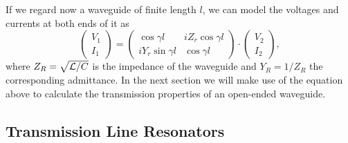 \smallskip

If we regard now a waveguide of finite length $l$, we can model the voltages and currents at both ends of it as \citep{pozar_microwave_2011}
%
\begin{equation}
\left( \begin{array}{c} V_1 \\ I_1 \end{array}\right) = \left( 
		\begin{array}{cc}
			\cos{\gamma l} & iZ_r \cos{\gamma l} \\
			i Y_r \sin{\gamma l} & \cos{\gamma l}
		\end{array}
		\right) \cdot \left(
		\begin{array}{c}
			V_2 \\ I_2
		\end{array}
		\right), \label{eq:cpw_abcd_matrix}
\end{equation}
%
where $Z_R=\sqrt{\begin{mathcal}L/C\end{mathcal}}$ is the impedance of the waveguide and $Y_R=1/Z_R$ the corresponding admittance. In the next section we will make use of the equation above to calculate the transmission properties of an open-ended waveguide.

\subsection{Transmission Line Resonators}


